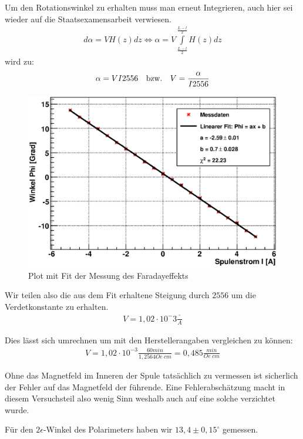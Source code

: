\documentclass[12pt]{article}
\begin{document}
Um den Rotationswinkel zu erhalten muss man erneut Integrieren, auch hier sei wieder auf die Staatsexamensarbeit verwiesen.
\begin{align}
 d\alpha = V H(z) dz \Leftrightarrow \alpha = V \int\limits_{\frac{L-l}{2}}^{\frac{L-l}{2}} H(z) dz
\end{align}
wird zu:
\begin{align}
 \alpha = V I 2556 \quad \textnormal{bzw.} \quad V = \frac{\alpha}{I 2556}
\end{align}

\begin{figure}[H]
\centering
\includegraphics[width=0.9\linewidth]{pictures/faraday.eps}
\caption{Plot mit Fit der Messung des Faradayeffekts}
\end{figure}

Wir teilen also die aus dem Fit erhaltene Steigung durch $2556$ um die Verdetkonstante zu erhalten.
\begin{align}
 V =  1,02 \cdot 10^-3 \frac{^\circ}{A}
\end{align}

Dies lässt sich umrechnen um mit den Herstellerangaben vergleichen zu können:
\begin{align}
 V = 1,02 \cdot 10^{-3} \frac{60min}{1,2564Oe~cm} = 0,485 \frac{min}{Oe~cm}
\end{align}

Ohne das Magnetfeld im Inneren der Spule tatsächlich zu vermessen ist sicherlich der Fehler auf das Magnetfeld der führende.
Eine Fehlerabschätzung macht in diesem Versuchsteil also wenig Sinn weshalb auch auf eine solche verzichtet wurde.

Für den $2\epsilon$-Winkel des Polarimeters haben wir $13,4 \pm 0,15^\circ$ gemessen.
\end{document}
